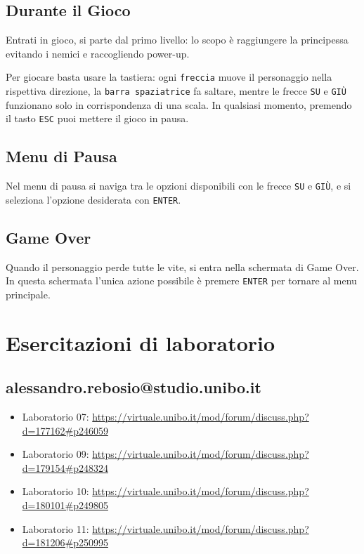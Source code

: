 \documentclass[a4paper,12pt]{report}
\begin{document}
\section{Durante il Gioco}
Entrati in gioco, si parte dal primo livello: lo scopo è raggiungere la principessa evitando i nemici e raccogliendo power-up.

Per giocare basta usare la tastiera: ogni \texttt{freccia} muove il personaggio nella rispettiva direzione, la \texttt{barra spaziatrice} fa saltare, mentre le frecce \texttt{SU} e \texttt{GIÙ} funzionano solo in corrispondenza di una scala. In qualsiasi momento, premendo il tasto \texttt{ESC} puoi mettere il gioco in pausa.

\section{Menu di Pausa}
Nel menu di pausa si naviga tra le opzioni disponibili con le frecce \texttt{SU} e \texttt{GIÙ}, e si seleziona l'opzione desiderata con \texttt{ENTER}.

\section{Game Over}
Quando il personaggio perde tutte le vite, si entra nella schermata di Game Over. In questa schermata l'unica azione possibile è premere \texttt{ENTER} per tornare al menu principale.

\chapter{Esercitazioni di laboratorio}
\section{alessandro.rebosio@studio.unibo.it}

\begin{itemize}
	\item Laboratorio 07: \url{https://virtuale.unibo.it/mod/forum/discuss.php?d=177162#p246059}
	\item Laboratorio 09: \url{https://virtuale.unibo.it/mod/forum/discuss.php?d=179154#p248324}
	\item Laboratorio 10: \url{https://virtuale.unibo.it/mod/forum/discuss.php?d=180101#p249805}
	\item Laboratorio 11: \url{https://virtuale.unibo.it/mod/forum/discuss.php?d=181206#p250995}
\end{itemize}




\nocite{*}
\end{document}

